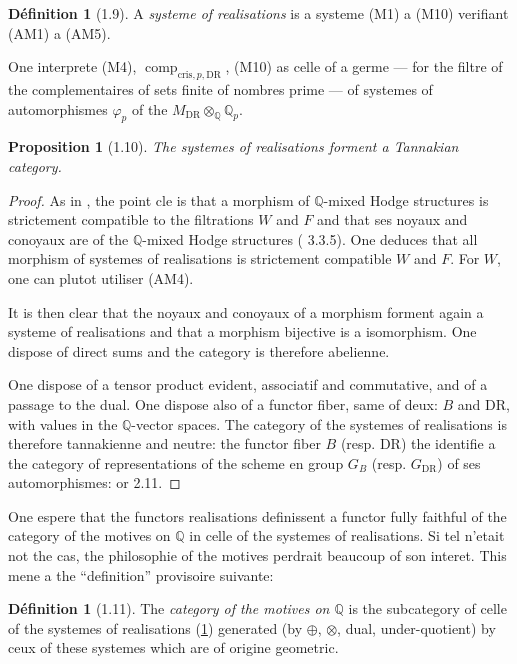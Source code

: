 \documentclass[12pt,a4paper]{article}
\theoremstyle{plain}
\newtheorem{proposition}[theorem]{Proposition}
\theoremstyle{definition}
\newtheorem{definition}[theorem]{D\'efinition}
\theoremstyle{remark}
\providecommand{\DR}{\mathrm{DR}}
\providecommand{\cris}{\mathrm{cris}}
\providecommand{\comp}{\operatorname{comp}}
\begin{document}
\begin{definition}[1.9]\label{def:systeme-realisations}
A \emph{systeme of realisations} is a systeme (M1) a (M10) verifiant (AM1) a
(AM5).

One interprete (M4), $\comp_{\cris,p,\DR}$, (M10) as celle of a germe --- for the
filtre of the complementaires of sets finite of nombres prime --- of systemes
of automorphismes $\varphi_p$ of the $M_{\DR} \otimes_{\mathbb{Q}} \mathbb{Q}_p$.
\end{definition}

\begin{proposition}[1.10]\label{prop:1.10}
The systemes of realisations forment a Tannakian category.
\end{proposition}

\begin{proof}
As in \cite{J}, the point cle is that a morphism of $\mathbb{Q}$-mixed Hodge structures is strictement compatible to the filtrations $W$ and $F$ and that ses noyaux and conoyaux
are of the $\mathbb{Q}$-mixed Hodge structures (\cite{D2} 3.3.5). One deduces that all
morphism of systemes of realisations is strictement compatible $W$ and $F$. For $W$,
one can plutot utiliser (AM4).

It is then clear that the noyaux and conoyaux of a morphism forment again a systeme
of realisations and that a morphism bijective is a isomorphism. One dispose of direct sums and the category is therefore abelienne.

One dispose of a tensor product evident, associatif and commutative, and of a passage to the
dual. One dispose also of a functor fiber, same of deux: $B$ and $\DR$, with values in
the $\mathbb{Q}$-vector spaces. The category of the systemes of realisations is therefore
tannakienne and neutre: the functor fiber $B$ (resp. $\DR$) the identifie a the category of representations of the scheme en group $G_B$ (resp. $G_\DR$) of ses automorphismes:
\cite{Sa} or \cite{DM} 2.11.
\end{proof}

One espere that the functors realisations definissent a functor fully faithful
of the category of the motives on $\mathbb{Q}$ in celle of the systemes of realisations. Si
tel n'etait not the cas, the philosophie of the motives perdrait beaucoup of son interet.
This mene a the ``definition'' provisoire suivante:

\begin{definition}[1.11]\label{def:1.11}
The \emph{category of the motives on $\mathbb{Q}$} is the subcategory of celle of the
systemes of realisations (\ref{def:systeme-realisations}) generated (by $\oplus$,
$\otimes$, dual, under-quotient) by ceux of these systemes which are of origine
geometric.
\end{definition}
\end{document}
